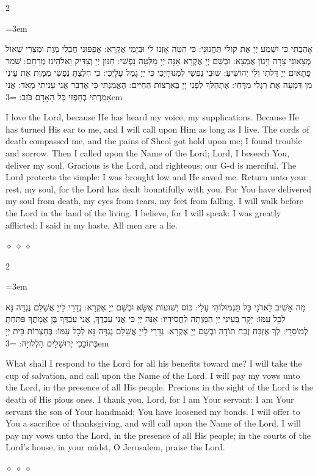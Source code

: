 \documentclass[11pt, openany]{book}
\newenvironment{bilingual}{%
  \par\vspace{4pt}%
  \begin{paracol}{2}%
}{%
  \end{paracol}%
  \par\vspace{2pt}%
}
\newenvironment{hebrewcol}{%
  \switchcolumn[1]%
  \begingroup
  \RTL
  \hebrewfont\large
  \setstretch{1.4}%
  \emergencystretch=3em
  \tolerance=9999
  \parindent=0pt\relax
}{%
  \endRTL
  \endgroup
}
\newenvironment{englishcol}{%
  \switchcolumn[0]%
  \begingroup
  \setstretch{1.4}%
  \emergencystretch=3em
  \tolerance=9999
  \normalsize
  \rightskip=0.12in\relax
}{%
  \endgroup
}
\newcommand{\parasep}{%
  \par\vspace{3pt}
  \begin{center}
    \textcolor{sedergold!50}{\tiny$\diamond\;\diamond\;\diamond$}
  \end{center}
  \par\vspace{3pt}
}
\begin{document}
\begin{bilingual}
\begin{hebrewcol}
אָהַבְתִּי כִּי יִשְׁמַע יְיָ אֶת קוֹלִי תַּחֲנוּנָי: כִּי הִטָּה אָזְנוֹ לִי וּבְיָמַי אֶקְרָא: אֲפָפוּנִי חֶבְלֵי מָוֶת וּמְצָרֵי שְׁאוֹל מְצָאוּנִי צָרָה וְיָגוֹן אֶמְצָא: וּבְשֵׁם יְיָ אֶקְרָא אָנָּה יְיָ מַלְּטָה נַפְשִׁי: חַנּוּן יְיָ וְצַדִּיק וֵאלֹהֵינוּ מְרַחֵם: שֹׁמֵר פְּתָאיִם יְיָ דַּלֹּתִי וְלִי יְהוֹשִׁיעַ: שׁוּבִי נַפְשִׁי לִמְנוּחָיְכִי כִּי יְיָ גָּמַל עָלָיְכִי: כִּי חִלַּצְתָּ נַפְשִׁי מִמָּוֶת אֶת עֵינִי מִן דִּמְעָה אֶת רַגְלִי מִדֶּחִי: אֶתְהַלֵּךְ לִפְנֵי יְיָ בְּאַרְצוֹת הַחַיִּים: הֶאֱמַנְתִּי כִּי אֲדַבֵּר אֲנִי עָנִיתִי מְאֹד: אֲנִי אָמַרְתִּי בְחָפְזִי כָּל הָאָדָם כֹּזֵב:
\end{hebrewcol}
\begin{englishcol}
I love the Lord, because He has heard my voice, my supplications. Because He has turned His ear to me, and I will  call upon Him as long as I live. The cords of death compassed me, and the pains of Sheol got hold upon me; I found trouble and sorrow. Then I called upon the Name of the Lord; Lord, I beseech You, deliver my soul. Gracious is the Lord, and righteous; our G-d is merciful. The Lord protects the simple: I was brought low and He saved me. Return unto your rest, my soul, for the Lord has dealt bountifully with you. For You have delivered my soul from death, my eyes from tears, my feet from falling. I will walk before the Lord in the land of the living. I believe, for I will speak: I was greatly afflicted: I said in my haste, All men are a lie.
\end{englishcol}
\end{bilingual}
\parasep

\begin{bilingual}
\begin{hebrewcol}
מָה אָשִׁיב לַאדֹנָי כָּל תַּגְמוּלוֹהִי עָלָי: כּוֹס יְשׁוּעוֹת אֶשָּׂא וּבְשֵׁם יְיָ אֶקְרָא: נְדָרַי לַייָ אֲשַׁלֵּם נֶגְדָּה נָּא לְכָל עַמּוֹ: יָקָר בְּעֵינֵי יְיָ הַמָּוְתָה לַחֲסִידָיו: אָנָּה יְיָ כִּי אֲנִי עַבְדֶּךָ, אֲנִי עַבְדְּךָ בֶּן אֲמָתֶךָ פִּתַּחְתָּ לְמוֹסֵרָי: לְךָ אֶזְבַּח זֶבַח תּוֹדָה וּבְשֵׁם יְיָ אֶקְרָא: נְדָרַי לַייָ אֲשַׁלֵּם נֶגְדָּה נָּא לְכָל עַמּוֹ: בְּחַצְרוֹת בֵּית יְיָ בְּתוֹכֵכִי יְרוּשָׁלָיִם הַלְלוּיָהּ:
\end{hebrewcol}
\begin{englishcol}
What shall I respond to the Lord for all his benefits toward me? I will take the cup of salvation, and call upon the Name of the Lord. I will pay my vows unto the Lord, in the presence of all His people. Precious in the sight of the Lord is the death of His pious ones. I thank you, Lord, for I am Your servant: I am Your servant the son of Your handmaid; You have loosened my bonds. I will offer to You a sacrifice of thanksgiving, and will call upon the Name of the Lord. I will pay my vows unto the Lord, in the presence of all His people; in the courts of the Lord's house, in your midst, O Jerusalem, praise the Lord.
\end{englishcol}
\end{bilingual}
\parasep
\end{document}
